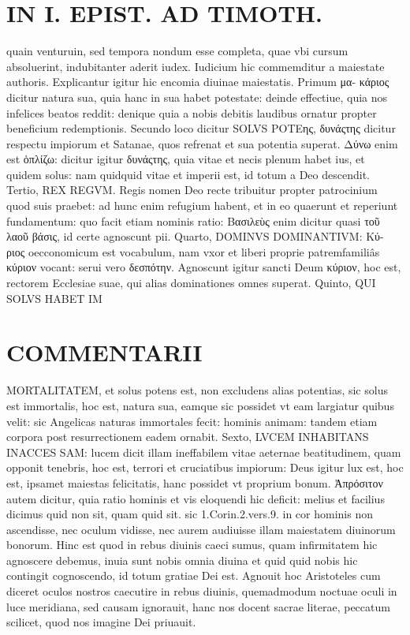 \documentclass{article}
\begin{document}
\begin{pages}
\section*{IN I. EPIST. AD TIMOTH. }
\marginpar{[ p.165 ]}\pstart quain venturuin, sed tempora nondum esse completa, quae vbi cursum absoluerint, indubitanter aderit iudex. Iudicium hic commemditur a maiestate authoris. Explicantur igitur hic encomia diuinae maiestatis. Primum μα- κάριος dicitur natura sua, quia hanc in sua habet potestate: deinde effectiue, quia nos infelices beatos reddit: denique quia a nobis debitis laudibus ornatur propter beneficium redemptionis. Secundo loco dicitur SOLVS POΤEης, δυνάςτης dicitur respectu impiorum et Satanae, quos refrenat et sua potentia superat. Δύνω enim est ὁπλίζω: dicitur igitur δυνάςτης, quia vitae et necis plenum habet ius, et quidem solus: nam quidquid vitae et imperii est, id totum a Deo descendit. Tertio, REX REGVM. Regis nomen Deo recte tribuitur propter patrocinium quod suis praebet: ad hunc enim refugium habent, et in eo quaerunt et reperiunt fundamentum: quo facit etiam nominis ratio: Βασιλεὺς enim dicitur quasi τοῦ λαοῦ βάσις, id certe agnoscunt pii.  \pend\pstart Quarto, DOMINVS DOMINANTIVM: Κύ- ριος oecconomicum est vocabulum, nam vxor et liberi proprie patremfamiliâs κύριον vocant: serui vero δεσπότην. Agnoscunt igitur sancti Deum κύριον, hoc est, rectorem Ecclesiae suae, qui alias dominationes omnes superat.  \pend\pstart Quinto, QUI SOLVS HABET IM\pend
\section*{COMMENTARII }
\marginpar{[ p.166 ]}\pstart MORTALITATEM, et solus potens est, non excludens alias potentias, sic solus est immortalis, hoc est, natura sua, eamque sic possidet vt eam largiatur quibus velit: sic Angelicas naturas immortales fecit: hominis animam: tandem etiam corpora post resurrectionem eadem ornabit.  \pend\pstart Sexto, LVCEM INHABITANS INACCES SAM: lucem dicit illam ineffabilem vitae aeternae beatitudinem, quam opponit tenebris, hoc est, terrori et cruciatibus impiorum: Deus igitur lux est, hoc est, ipsamet maiestas felicitatis, hanc possidet vt proprium bonum. Ἀπρόσιτον autem dicitur, quia ratio hominis et vis eloquendi hic deficit: melius et facilius dicimus quid non sit, quam quid sit. sic 1.Corin.2.vers.9. in cor hominis non ascendisse, nec oculum vidisse, nec aurem audiuisse illam maiestatem diuinorum bonorum. Hinc est quod in rebus diuinis caeci sumus, quam infirmitatem hic agnoscere debemus, inuia sunt nobis omnia diuina et quid quid nobis hic contingit cognoscendo, id totum gratiae Dei est. Agnouit hoc Aristoteles cum diceret oculos nostros caecutire in rebus diuinis, quemadmodum noctuae oculi in luce meridiana, sed causam ignorauit, hanc nos docent sacrae literae, peccatum scilicet, quod nos imagine Dei priuauit.  \pend

\end{pages}
\end{document}
